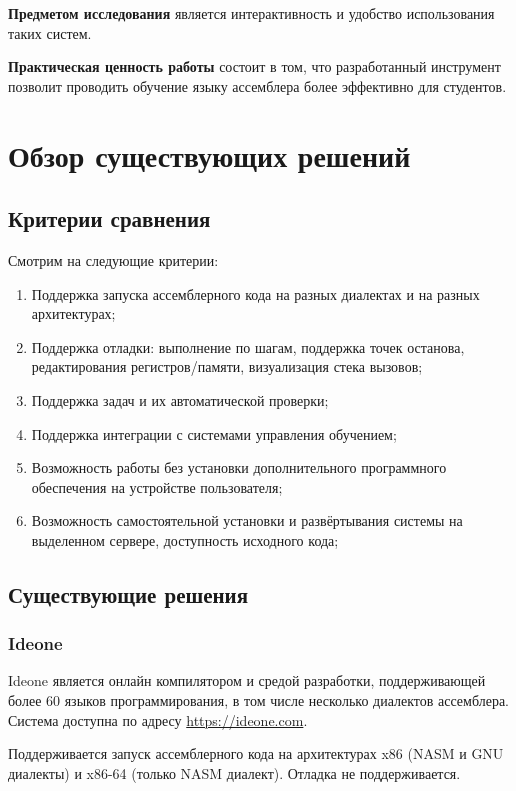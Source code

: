 \documentclass[a4paper,article,14pt]{extarticle}
\begin{document}
\textbf{Предметом исследования} является интерактивность и удобство использования таких систем.

\textbf{Практическая ценность работы} состоит в том, что разработанный инструмент позволит проводить обучение языку ассемблера более эффективно для студентов.

\section{Обзор существующих решений}
\subsection{Критерии сравнения}

Смотрим на следующие критерии:

\begin{enumerate}
    \item Поддержка запуска ассемблерного кода на разных диалектах и на разных архитектурах;
    \item Поддержка отладки: выполнение по шагам, поддержка точек останова, редактирования регистров/памяти, визуализация стека вызовов;
    \item Поддержка задач и их автоматической проверки;
    \item Поддержка интеграции с системами управления обучением;
    \item Возможность работы без установки дополнительного программного обеспечения на устройстве пользователя;
    \item Возможность самостоятельной установки и развёртывания системы на выделенном сервере, доступность исходного кода;
\end{enumerate}

\subsection{Существующие решения}
\subsubsection{Ideone}

Ideone является онлайн компилятором и средой разработки, поддерживающей более 60 языков программирования, в том числе несколько диалектов ассемблера. Система доступна по адресу \url{https://ideone.com}.

Поддерживается запуск ассемблерного кода на архитектурах x86 (NASM и GNU диалекты) и x86-64 (только NASM диалект). Отладка не поддерживается.
\end{document}
